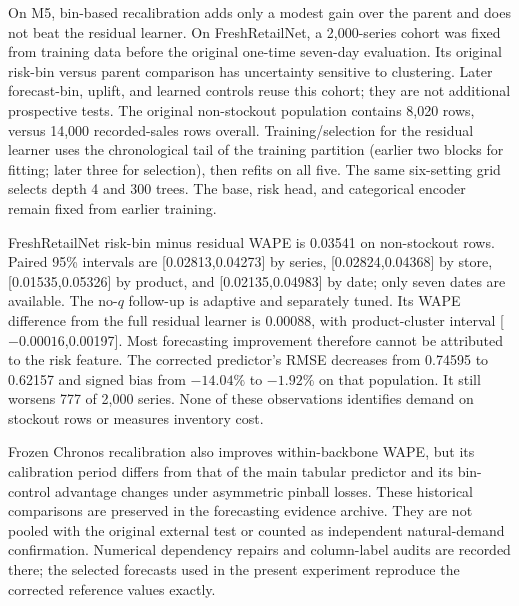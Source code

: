 On M5, bin-based recalibration adds only a modest gain over the parent and does not beat the residual learner. On FreshRetailNet, a 2,000-series cohort was fixed from training data before the original one-time seven-day evaluation. Its original risk-bin versus parent comparison has uncertainty sensitive to clustering. Later forecast-bin, uplift, and learned controls reuse this cohort; they are not additional prospective tests. The original non-stockout population contains 8,020 rows, versus 14,000 recorded-sales rows overall. Training/selection for the residual learner uses the chronological tail of the training partition (earlier two blocks for fitting; later three for selection), then refits on all five. The same six-setting grid selects depth 4 and 300 trees. The base, risk head, and categorical encoder remain fixed from earlier training.

FreshRetailNet risk-bin minus residual WAPE is 0.03541 on non-stockout rows. Paired 95\% intervals are [0.02813,0.04273] by series, [0.02824,0.04368] by store, [0.01535,0.05326] by product, and [0.02135,0.04983] by date; only seven dates are available. The no-$q$ follow-up is adaptive and separately tuned. Its WAPE difference from the full residual learner is 0.00088, with product-cluster interval [$-0.00016$,0.00197]. Most forecasting improvement therefore cannot be attributed to the risk feature. The corrected predictor's RMSE decreases from 0.74595 to 0.62157 and signed bias from $-14.04\%$ to $-1.92\%$ on that population. It still worsens 777 of 2,000 series. None of these observations identifies demand on stockout rows or measures inventory cost.

Frozen Chronos recalibration also improves within-backbone WAPE, but its calibration period differs from that of the main tabular predictor and its bin-control advantage changes under asymmetric pinball losses. These historical comparisons are preserved in the forecasting evidence archive. They are not pooled with the original external test or counted as independent natural-demand confirmation. Numerical dependency repairs and column-label audits are recorded there; the selected forecasts used in the present experiment reproduce the corrected reference values exactly.
